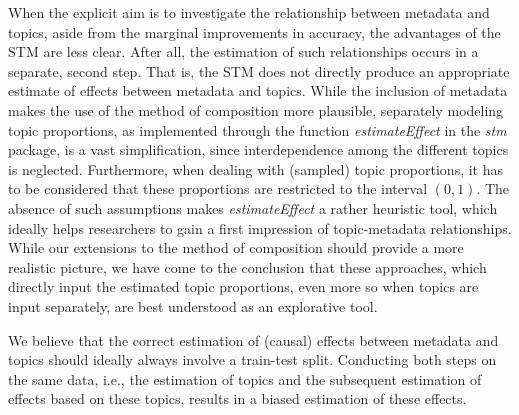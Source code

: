 When the explicit aim is to investigate the relationship between metadata and topics, aside from the marginal improvements in accuracy, the advantages of the STM are less clear. After all, the estimation of such relationships occurs in a separate, second step. That is, the STM does not directly produce an appropriate estimate of effects between metadata and topics. While the inclusion of metadata makes the use of the method of composition more plausible, separately modeling topic proportions, as implemented through the function \textit{estimateEffect} in the \textit{stm} package, is a vast simplification, since interdependence among the different topics is neglected. Furthermore, when dealing with (sampled) topic proportions, it has to be considered that these proportions are restricted to the interval $(0,1)$. The absence of such assumptions makes \textit{estimateEffect} a rather heuristic tool, which ideally helps researchers to gain a first impression of topic-metadata relationships. While our extensions to the method of composition should provide a more realistic picture, we have come to the conclusion that these approaches, which directly input the estimated topic proportions, even more so when topics are input separately, are best understood as an explorative tool.

We believe that the correct estimation of (causal) effects between metadata and topics should ideally always involve a train-test split. Conducting both steps on the same data, i.e., the estimation of topics and the subsequent estimation of effects based on these topics, results in a biased estimation of these effects. 
